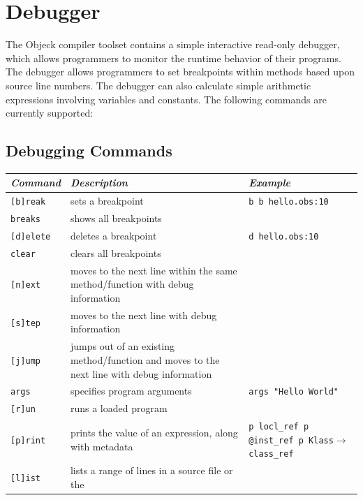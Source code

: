 \documentclass[11pt]{article}
\begin{document}
\section{Debugger}
The Objeck compiler toolset contains a simple interactive read-only
debugger, which allows programmers to monitor the runtime behavior of
their programs.  The debugger allows programmers to set breakpoints
within methods based upon source line numbers.  The debugger can also
calculate simple arithmetic expressions involving variables and
constants. The following commands are currently supported:

\subsection{Debugging Commands}
\begin{center}
  \begin{tabular}{| l |p{4 cm} |p{4 cm} |}
    \hline
    \emph{Command} & \emph{Description} & \emph{Example} \\ \hline \hline
    \texttt{[b]reak} &  sets a breakpoint & \texttt{b \newline b hello.obs:10} \\ \hline
    \texttt{breaks} &  shows all breakpoints &  \\ \hline
    \texttt{[d]elete} &  deletes a breakpoint & \texttt{d hello.obs:10} \\ \hline
    \texttt{clear} &  clears all breakpoints &  \\ \hline
    \texttt{[n]ext} &  moves to the next line within the same
    method/function with debug information & \\ \hline
    \texttt{[s]tep} &  moves to the next line with debug information &  \\ \hline
    \texttt{[j]ump} &  jumps out of an existing method/function and moves to the next line with debug information &  \\ \hline
    \texttt{args} &  specifies program arguments & \texttt{args "Hello World"} \\ \hline
    \texttt{[r]un} &  runs a loaded program &  \\ \hline
    \texttt{[p]rint} &  prints the value of an expression, along with
    metadata & \texttt{p locl\_ref \newline p @inst\_ref \newline p Klass$\rightarrow$class\_ref} \\ \hline
    \texttt{[l]ist} &  lists a range of lines in a source file or the

\end{tabular}
\end{center}
\end{document}
